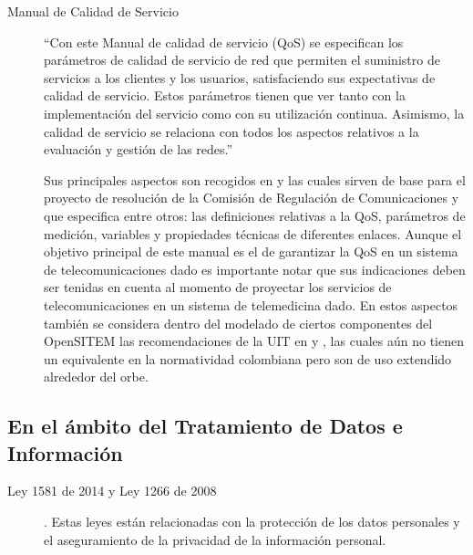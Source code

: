 \begin{description}
\item [Manual de Calidad de Servicio] “Con este Manual de calidad de servicio (QoS) se especifican los parámetros de calidad de servicio de red que permiten el suministro de servicios a los clientes y los usuarios, satisfaciendo sus expectativas de calidad de servicio. Estos parámetros tienen que ver tanto con la implementación del servicio como con su utilización continua. Asimismo, la calidad de servicio se relaciona con todos los aspectos relativos a la evaluación y gestión de las redes.”\cite{ITU2004}

Sus principales aspectos son recogidos en \cite{crtcondiciones} y \cite{crtindicadores}  las cuales sirven de base para el proyecto de resolución\cite{crtqos} de la Comisión de Regulación de Comunicaciones y que especifica entre otros: las definiciones relativas a la QoS, parámetros de medición, variables y propiedades técnicas de diferentes enlaces. Aunque el objetivo principal de este manual es el de garantizar la QoS en un sistema de telecomunicaciones dado es importante notar que sus indicaciones deben ser tenidas en cuenta al momento de proyectar los servicios de telecomunicaciones en un sistema de telemedicina dado. En estos aspectos también se considera dentro del modelado de ciertos componentes del OpenSITEM las recomendaciones de la UIT en \cite{ITUG1000} y \cite{ITUG1010}, las cuales aún no tienen un equivalente en la normatividad colombiana pero son de uso extendido alrededor del orbe.

\end{description}

\subsection{En el ámbito del Tratamiento de Datos e Información}  

\begin{description}
 \item[Ley 1581 de 2014 y Ley 1266 de 2008]. Estas leyes están relacionadas con la protección de los datos personales y el aseguramiento de la privacidad de la información personal.
 
\end{description}